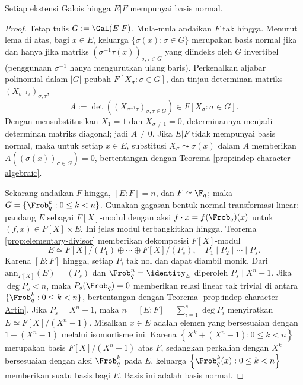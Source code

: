 \begin{theorem}\label{prop:normal-basis}
	Setiap ekstensi Galois hingga $E|F$ mempunyai basis normal.
\end{theorem}
\begin{proof}
	Tetap tulis $G := \Gal(E|F)$. Mula-mula andaikan $F$ tak hingga. Menurut lema di atas, bagi $x \in E$, keluarga $\{\sigma(x) : \sigma \in G \}$ merupakan basis normal jika dan hanya jika matriks $(\sigma^{-1}\tau(x))_{\sigma, \tau \in G}$ yang diindeks oleh $G$ invertibel (penggunaan $\sigma^{-1}$ hanya mengurutkan ulang baris). Perkenalkan aljabar polinomial dalam $|G|$ peubah $F[X_\sigma : \sigma \in G]$, dan tinjau determinan matriks $(X_{\sigma^{-1}\tau})_{\sigma,\tau}$,
	\[ A := \det\left( (X_{\sigma^{-1}\tau})_{\sigma, \tau \in G} \right) \in F[X_\sigma : \sigma \in G]. \]
	Dengan mensubstitusikan $X_1=1$ dan $X_{\sigma\neq1}=0$, determinannya menjadi determinan matriks diagonal; jadi $A\neq0$. Jika $E|F$ tidak mempunyai basis normal, maka untuk setiap $x\in E$, substitusi $X_\sigma\leadsto\sigma(x)$ dalam $A$ memberikan $A((\sigma(x))_{\sigma\in G})=0$, bertentangan dengan Teorema \ref{prop:indep-character-algebraic}.
	
	Sekarang andaikan $F$ hingga, $[E:F]=n$, dan $F\simeq\F_q$; maka $G=\{\Frob_q^k:0\leq k<n\}$. Gunakan gagasan bentuk normal transformasi linear: pandang $E$ sebagai $F[X]$-modul dengan aksi $f\cdot x=f(\Frob_q)(x)$ untuk $(f,x)\in F[X]\times E$. Ini jelas modul terbangkitkan hingga. Teorema \ref{prop:elementary-divisor} memberikan dekomposisi $F[X]$-modul
	\[ E \simeq F[X]/(P_1) \oplus \cdots \oplus F[X]/(P_s), \quad P_1 \mid P_2 \mid \cdots \mid P_s. \]
	Karena $[E:F]$ hingga, setiap $P_i$ tak nol dan dapat diambil monik. Dari $\text{ann}_{F[X]}(E) = (P_s)$ dan $\Frob_q^n = \identity_E$ diperoleh $P_s \mid X^n - 1$. Jika $\deg P_s < n$, maka $P_s(\Frob_q)=0$ memberikan relasi linear tak trivial di antara $\{\Frob_q^k : 0 \leq k < n \}$, bertentangan dengan Teorema \ref{prop:indep-character-Artin}. Jika $P_s = X^n - 1$, maka $n = [E:F] = \sum_{i=1}^s \deg P_i$ menyiratkan $E \simeq F[X]/(X^n-1)$. Misalkan $x \in E$ adalah elemen yang bersesuaian dengan $1 + (X^n - 1)$ melalui isomorfisme ini. Karena $\left\{ X^k + (X^n - 1) : 0 \leq k < n \right\}$ merupakan basis $F[X]/(X^n-1)$ atas $F$, sedangkan perkalian dengan $X^k$ bersesuaian dengan aksi $\Frob_q^k$ pada $E$, keluarga $\left\{ \Frob_q^k(x) : 0 \leq k < n \right\}$ memberikan suatu basis bagi $E$. Basis ini adalah basis normal.
\end{proof}

